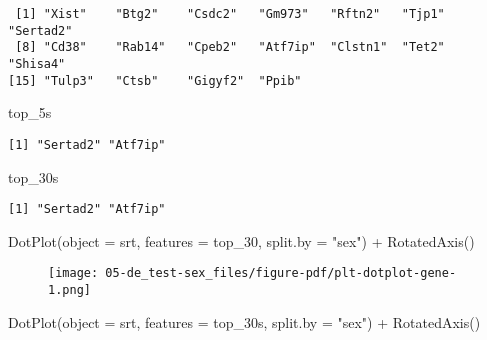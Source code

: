 \documentclass[
  letterpaper,
  DIV=11,
  numbers=noendperiod]{scrartcl}
\newenvironment{Shaded}{\begin{snugshade}}{\end{snugshade}}
\newcommand{\AttributeTok}[1]{\textcolor[rgb]{0.40,0.45,0.13}{#1}}
\newcommand{\FunctionTok}[1]{\textcolor[rgb]{0.28,0.35,0.67}{#1}}
\newcommand{\NormalTok}[1]{\textcolor[rgb]{0.00,0.23,0.31}{#1}}
\newcommand{\SpecialCharTok}[1]{\textcolor[rgb]{0.37,0.37,0.37}{#1}}
\newcommand{\StringTok}[1]{\textcolor[rgb]{0.13,0.47,0.30}{#1}}
\begin{document}
\begin{verbatim}
 [1] "Xist"    "Btg2"    "Csdc2"   "Gm973"   "Rftn2"   "Tjp1"    "Sertad2"
 [8] "Cd38"    "Rab14"   "Cpeb2"   "Atf7ip"  "Clstn1"  "Tet2"    "Shisa4" 
[15] "Tulp3"   "Ctsb"    "Gigyf2"  "Ppib"   
\end{verbatim}

\begin{Shaded}
\begin{Highlighting}[]
\NormalTok{top\_5s}
\end{Highlighting}
\end{Shaded}

\begin{verbatim}
[1] "Sertad2" "Atf7ip" 
\end{verbatim}

\begin{Shaded}
\begin{Highlighting}[]
\NormalTok{top\_30s}
\end{Highlighting}
\end{Shaded}

\begin{verbatim}
[1] "Sertad2" "Atf7ip" 
\end{verbatim}

\begin{Shaded}
\begin{Highlighting}[]
\FunctionTok{DotPlot}\NormalTok{(}\AttributeTok{object =}\NormalTok{ srt, }\AttributeTok{features =}\NormalTok{ top\_30, }\AttributeTok{split.by =} \StringTok{"sex"}\NormalTok{) }\SpecialCharTok{+} \FunctionTok{RotatedAxis}\NormalTok{()}
\end{Highlighting}
\end{Shaded}

\begin{figure}[H]

{\centering \texttt{[image: 05-de\_test-sex\_files/figure-pdf/plt-dotplot-gene-1.png]}

}

\end{figure}

\begin{Shaded}
\begin{Highlighting}[]
\FunctionTok{DotPlot}\NormalTok{(}\AttributeTok{object =}\NormalTok{ srt, }\AttributeTok{features =}\NormalTok{ top\_30s, }\AttributeTok{split.by =} \StringTok{"sex"}\NormalTok{) }\SpecialCharTok{+} \FunctionTok{RotatedAxis}\NormalTok{()}
\end{Highlighting}
\end{Shaded}
\end{document}
